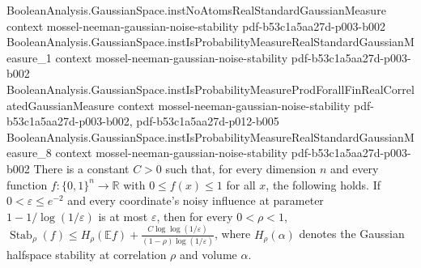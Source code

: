 \begin{theorem}
\proofstep
  {BooleanAnalysis.GaussianSpace.instNoAtomsRealStandardGaussianMeasure}
  {context}
  {mossel-neeman-gaussian-noise-stability}
  {pdf-b53c1a5aa27d-p003-b002}
\proofstep
  {BooleanAnalysis.GaussianSpace.instIsProbabilityMeasureRealStandardGaussianMeasure_1}
  {context}
  {mossel-neeman-gaussian-noise-stability}
  {pdf-b53c1a5aa27d-p003-b002}
\proofstep
  {BooleanAnalysis.GaussianSpace.instIsProbabilityMeasureProdForallFinRealCorrelatedGaussianMeasure}
  {context}
  {mossel-neeman-gaussian-noise-stability}
  {pdf-b53c1a5aa27d-p003-b002,
    pdf-b53c1a5aa27d-p012-b005}
\proofstep
  {BooleanAnalysis.GaussianSpace.instIsProbabilityMeasureRealStandardGaussianMeasure_8}
  {context}
  {mossel-neeman-gaussian-noise-stability}
  {pdf-b53c1a5aa27d-p003-b002}
There is a constant $C>0$ such that, for every dimension $n$ and every function
$f:\{0,1\}^n\to\mathbb R$ with $0\le f(x)\le1$ for all $x$, the following holds. If
$0<\varepsilon\le e^{-2}$ and every coordinate's noisy influence at parameter
$1-1/\log(1/\varepsilon)$ is at most $\varepsilon$, then for every $0<\rho<1$,
$\operatorname{Stab}_\rho(f)\le H_\rho(\mathbb E
f)+\frac{C\log\log(1/\varepsilon)}{(1-\rho)\log(1/\varepsilon)}$, where $H_\rho(\alpha)$
denotes the Gaussian halfspace stability at correlation $\rho$ and volume $\alpha$.
\end{theorem}

